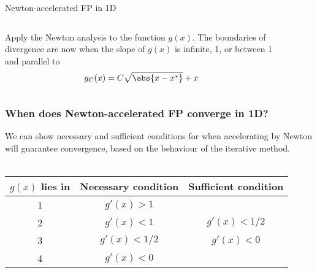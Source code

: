 \documentclass{beamer}
\begin{document}
\begin{frame}{Newton-accelerated FP in 1D}
    \begin{columns}
        \begin{column}{0.5\textwidth}
            Apply the Newton analysis to the function $g(x)$.
            The boundaries of divergence are now when the slope of $g(x)$ is infinite, 1, or between 1 and parallel to
            \begin{equation*}
            	g_C(x) = C \sqrt{ \abs{ x - x^*}} + x
	    \end{equation*}
        \end{column}
        \begin{column}{0.5\textwidth}
            \begin{figure}
                \centering
                \label{fig:NRFP}
            \end{figure}
        \end{column}
    \end{columns}
\end{frame}

\begin{frame}
\frametitle{When does Newton-accelerated FP converge in 1D?}

We can show necessary and sufficient conditions for when accelerating by Newton will guarantee convergence, based on the behaviour of the iterative method.
\\~\\
\centering
    \begin{tabular}{c|c|c}
        $g(x)$ lies in & Necessary condition & Sufficient condition \\ \hline
        1 & $g'(x) >1$ \\
        2 & $g'(x) < 1$ & $g'(x) < 1/2$ \\
        3 & $g'(x) < 1/2$ & $g'(x) < 0$ \\
        4 & $g'(x) < 0$
    \end{tabular}
\end{frame}
\end{document}

